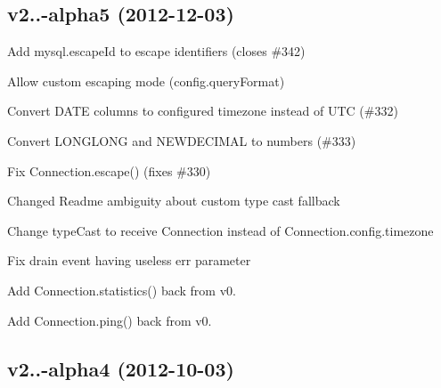 \subsection*{v2..-\/alpha5 (2012-\/12-\/03)}


\begin{DoxyItemize}
\item Add mysql.\+escape\+Id to escape identifiers (closes \#342)
\item Allow custom escaping mode (config.\+query\+Format)
\item Convert D\+A\+T\+E columns to configured timezone instead of U\+T\+C (\#332)
\item Convert L\+O\+N\+G\+L\+O\+N\+G and N\+E\+W\+D\+E\+C\+I\+M\+A\+L to numbers (\#333)
\item Fix Connection.\+escape() (fixes \#330)
\item Changed Readme ambiguity about custom type cast fallback
\item Change type\+Cast to receive Connection instead of Connection.\+config.\+timezone
\item Fix drain event having useless err parameter
\item Add Connection.\+statistics() back from v0.
\item Add Connection.\+ping() back from v0.
\end{DoxyItemize}

\subsection*{v2..-\/alpha4 (2012-\/10-\/03)}


